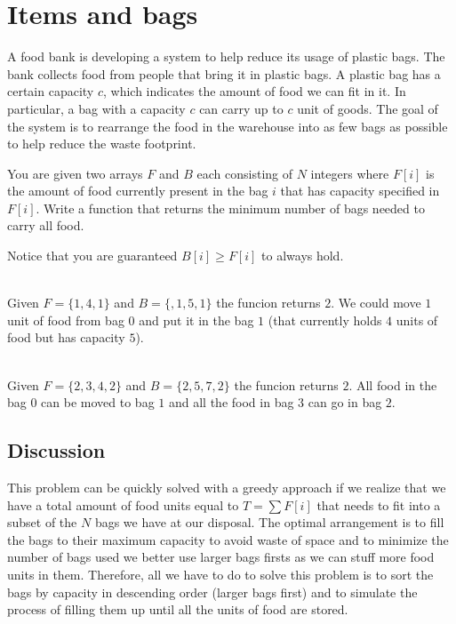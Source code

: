 \section{Items and bags}
\begin{exercise}
A food bank is developing a system to help reduce its usage of plastic bags. The bank collects food from people that bring it in plastic bags. 
A plastic bag has a certain capacity $c$, which indicates the amount of food we can fit in it. In particular, a bag with a capacity $c$ can carry up to $c$ unit of goods.
The goal of the system is to rearrange the food in the warehouse into as few bags as possible to help reduce the waste footprint.

You are given two arrays $F$ and $B$ each consisting of $N$ integers where $F[i]$ is the amount of food currently present in the bag $i$ that has capacity specified in $F[i]$.
Write a function that returns the minimum number of bags needed to carry all food.

Notice that you are guaranteed $B[i] \geq F[i]$ to always hold.
    \begin{example}
        \label{ex:items_and_bags:example1}
        \hfill \\
        Given $F=\{1,4,1\}$ and $B=\{,1,5,1\}$ the funcion returns $2$. We could move $1$ unit of food from bag $0$ and put it in the bag $1$ (that currently holds $4$ units of food but has capacity $5$).
    \end{example}
    
    \begin{example}
        \label{ex:items_and_bags:example2}
        \hfill \\
        Given $F=\{2,3,4,2\}$ and $B=\{2,5,7,2\}$ the funcion returns $2$. All food in the bag $0$ can be moved to bag $1$ and all the food in bag $3$ can go in bag $2$.
    \end{example}
\end{exercise}
 

\subsection{Discussion}
This problem can be quickly solved with a greedy approach if we realize that we have a total amount of food units equal to $T=\sum F[i]$ that needs to fit into a subset of the $N$ bags we have at our disposal. 
The optimal arrangement is to fill the bags to their maximum capacity to avoid waste of space and to minimize the number of bags used we better use larger bags firsts as we can stuff more food units in them. 
Therefore, all we have to do to solve this problem is to sort the bags by capacity in descending order (larger bags first) and to simulate the process of filling them up until all the units of food are stored.

